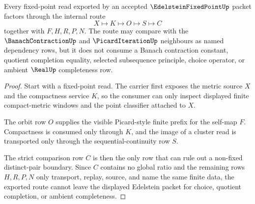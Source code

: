 \begin{theorem}\label{thm:edelstein-fixed-point-compact-route-nonescape}
Every fixed-point read exported by an accepted $\EdelsteinFixedPointUp$ packet factors through the internal route
$$
X\longmapsto K\longmapsto O\longmapsto S\longmapsto C
$$
together with $F,H,R,P,N$. The route may compare with the $\BanachContractionUp$ and $\PicardIterationUp$ neighbours as named dependency rows, but it does not consume a Banach contraction constant, quotient completion equality, selected subsequence principle, choice operator, or ambient $\RealUp$ completeness row.
\end{theorem}
\begin{proof}
Start with a fixed-point read. The carrier first exposes the metric source $X$ and the compactness service $K$, so the consumer can only inspect displayed finite compact-metric windows and the point classifier attached to $X$.

The orbit row $O$ supplies the visible Picard-style finite prefix for the self-map $F$. Compactness is consumed only through $K$, and the image of a cluster read is transported only through the sequential-continuity row $S$.

The strict comparison row $C$ is then the only row that can rule out a non-fixed distinct-pair boundary. Since $C$ contains no global ratio and the remaining rows $H,R,P,N$ only transport, replay, source, and name the same finite data, the exported route cannot leave the displayed Edelstein packet for choice, quotient completion, or ambient completeness.
\end{proof}




